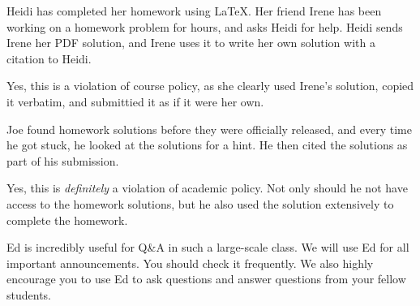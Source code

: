\documentclass[11pt]{article}
\begin{document}
\begin{Parts}
  \Part Heidi has completed her homework using \LaTeX. Her friend Irene has been working on a homework problem for hours, and asks Heidi for help. Heidi sends Irene her PDF solution, and Irene uses it to write her own solution with a citation to Heidi.
  
  \begin{solution}
    Yes, this is a violation of course policy, as she clearly used Irene's solution, copied it verbatim, and submittied it as if it were her own.
  \end{solution}
  
  \Part
  Joe found homework solutions before they were officially released, and every time he got stuck, he looked at the solutions for a hint. He then cited the solutions as part of his submission.

  \begin{solution}
    Yes, this is \textit{definitely} a violation of academic policy. Not only should he not have access to the homework solutions, but he also used the solution extensively to complete the homework. 
  \end{solution}
\end{Parts}


Ed is incredibly useful for Q\&A in such a large-scale class. We will use Ed for all important announcements. You should check it frequently. We also highly encourage you to use Ed to ask questions and answer questions from your fellow students.
\end{document}
